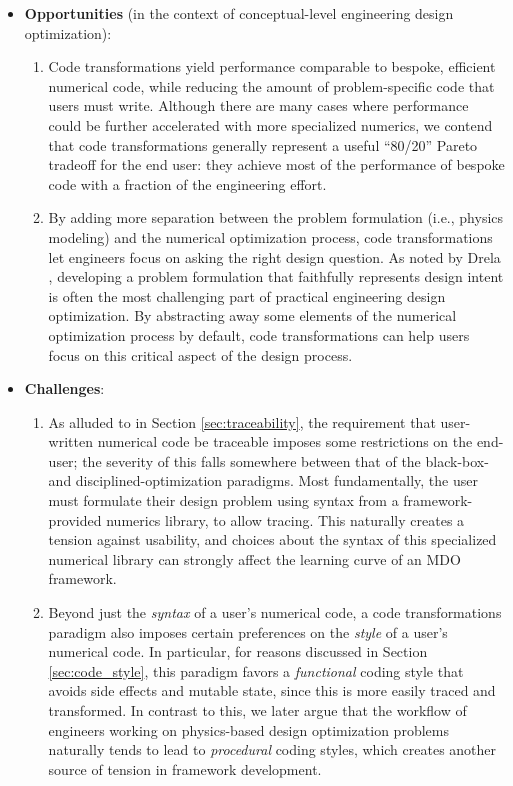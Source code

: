 \begin{itemize}
    \item \textbf{Opportunities} (in the context of conceptual-level engineering design optimization):
    \begin{enumerate}
        \item Code transformations yield performance comparable to bespoke, efficient numerical code, while reducing the amount of problem-specific code that users must write. Although there are many cases where performance could be further accelerated with more specialized numerics, we contend that code transformations generally represent a useful ``80/20'' Pareto tradeoff for the end user: they achieve most of the performance of bespoke code with a fraction of the engineering effort.
        \item By adding more separation between the problem formulation (i.e., physics modeling) and the numerical optimization process, code transformations let engineers focus on asking the right design question. As noted by Drela \cite{drela_pros_1998}, developing a problem formulation that faithfully represents design intent is often the most challenging part of practical engineering design optimization. By abstracting away some elements of the numerical optimization process by default, code transformations can help users focus on this critical aspect of the design process.
    \end{enumerate}
    \item \textbf{Challenges}:
    \begin{enumerate}
        \item As alluded to in Section \ref{sec:traceability}, the requirement that user-written numerical code be traceable imposes some restrictions on the end-user; the severity of this falls somewhere between that of the black-box- and disciplined-optimization paradigms. Most fundamentally, the user must formulate their design problem using syntax from a framework-provided numerics library, to allow tracing. This naturally creates a tension against usability, and choices about the syntax of this specialized numerical library can strongly affect the learning curve of an MDO framework.
        \item Beyond just the \emph{syntax} of a user's numerical code, a code transformations paradigm also imposes certain preferences on the \emph{style} of a user's numerical code. In particular, for reasons discussed in Section \ref{sec:code_style}, this paradigm favors a \emph{functional} coding style that avoids side effects and mutable state, since this is more easily traced and transformed. In contrast to this, we later argue that the workflow of engineers working on physics-based design optimization problems naturally tends to lead to \emph{procedural} coding styles, which creates another source of tension in framework development.
    \end{enumerate}
\end{itemize}

